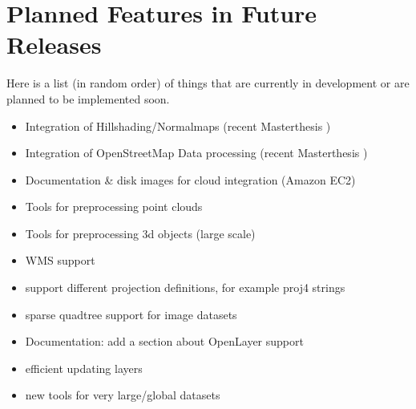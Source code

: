 \documentclass[
	12pt,
	a4paper,
	english,	
	appendixprefix,				     			        
	openany,		     	
	abstracton,		    		    
 	BCOR8mm,		    
]{scrartcl}
\begin{document}





\section{Planned Features in Future Releases}\label{planned}

Here is a list (in random order) of things that are currently in development or are planned to be implemented soon.

\begin{itemize}
\item Integration of Hillshading/Normalmaps (recent Masterthesis \cite{wuest2012})
\item Integration of OpenStreetMap Data processing (recent Masterthesis \cite{wuest2012})
\item Documentation \& disk images for cloud integration (Amazon EC2)
\item Tools for preprocessing point clouds
\item Tools for preprocessing 3d objects (large scale)
\item WMS support
\item support different projection definitions, for example proj4 strings
\item sparse quadtree support for image datasets
\item Documentation: add a section about OpenLayer support
\item efficient updating layers
\item new tools for very large/global datasets
\end{itemize}




\end{document}

